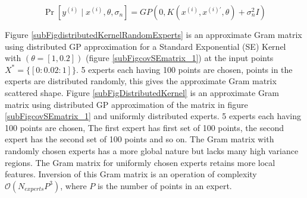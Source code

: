 \begin{equation}\label{distributedGPPrior}
    \Pr[y^{(i)} \mid x^{(i)}, \theta, \sigma_{n}] = GP(0, K(x^{(i)}, x^{(i)'}, \theta) + \sigma^{2}_{n}I) 
\end{equation}

Figure \ref{subFigdistributedKernelRandomExperts} is an approximate Gram matrix using distributed GP approximation for a Standard Exponential (SE) Kernel with $(\theta = [1, 0.2])$ (figure \ref{subFigcovSEmatrix_1}) at the input points $X^{*} = \{[0:0.02:1]\}$. 5 experts each having 100 points are chosen, points in the experts are distributed randomly, this gives the approximate Gram matrix scattered shape. Figure \ref{subFigDistributedKernel} is an approximate Gram matrix using distributed GP approximation of the matrix in figure \ref{subFigcovSEmatrix_1} and uniformly distributed experts. 5 experts each having 100 points are chosen, The first expert has first set of 100 points, the second expert has the second set of 100 points and so on. The Gram matrix with randomly chosen experts has a more global nature but lacks many high variance regions. The Gram matrix for uniformly chosen experts retains more local features. Inversion of this Gram matrix is an operation of complexity $\mathcal{O}(N_{experts}P^{3})$, where $P$ is the number of points in an expert.

